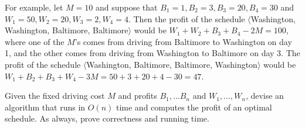 \documentclass[11pt]{article}
\begin{document}
For example, let $M = 10$ and suppose that $B_1 = 1, B_2 = 3, B_3 = 20, B_4 = 30$ and $W_1 = 50, W_2 = 20, W_3 = 2, W_4 = 4$.  Then the profit of the schedule $\langle$Washington, Washington, Baltimore, Baltimore$\rangle$ would be $W_1 + W_2 + B_3 + B_4 - 2M = 100$, where one of the $M$'s comes from driving from Baltimore to Washington on day 1, and the other comes from driving from Washington to Baltimore on day 3.  The profit of the schedule $\langle$Washington, Baltimore, Baltimore, Washington$\rangle$ would be $W_1 + B_2 + B_3 + W_4 - 3M = 50 +3 + 20 + 4 - 30 = 47$.

Given the fixed driving cost $M$ and profits $B_1, \dots B_n$ and $W_1, \dots, W_n$, devise an algorithm that runs in $O(n)$ time and computes the profit of an optimal schedule.  As always, prove correctness and running time.  
\end{document}
